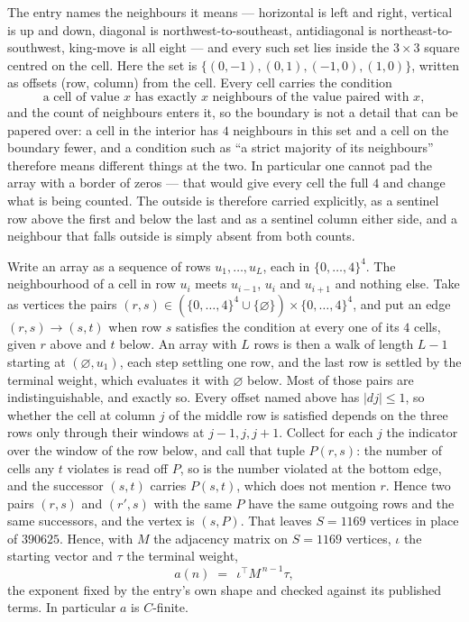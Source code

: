 \documentclass[11pt,a4paper]{article}
\theoremstyle{plain}
\theoremstyle{definition}
\begin{document}
The entry names the neighbours it means --- horizontal is left and right, vertical is up and
down, diagonal is northwest-to-southeast, antidiagonal is northeast-to-southwest, king-move is
all eight --- and every such set lies inside the $3\times3$ square centred on the cell. Here
the set is $\{(0,-1), (0,1), (-1,0), (1,0)\}$, written as offsets (row, column) from the cell. Every cell carries
the condition
\[
\text{a cell of value }x\text{ has exactly }x\text{ neighbours of the value paired with }x,
\]
and the count of neighbours enters it, so the boundary is not a detail that can be papered
over: a cell in the interior has $4$ neighbours in this set and a cell on the boundary
fewer, and a condition such as ``a strict majority of its neighbours'' therefore means
different things at the two. In particular one cannot pad the array with a border of zeros ---
that would give every cell the full $4$ and change what is being counted. The outside is
therefore carried
explicitly, as a sentinel row above the first and below the last and as a sentinel column
either side, and a neighbour that falls outside is simply absent from both counts.

Write an array as a sequence of rows $u_1,\dots,u_L$, each in
$\{0,\dots,4\}^{4}$. The neighbourhood of a cell in row $u_i$ meets $u_{i-1}$,
$u_i$ and $u_{i+1}$ and nothing else. Take as vertices the pairs
$(r,s)\in(\{0,\dots,4\}^{4}\cup\{\varnothing\})\times\{0,\dots,4\}^{4}$,
and put an edge $(r,s)\to(s,t)$ when row $s$ satisfies the condition at every one of its
$4$ cells, given $r$ above and $t$ below. An array with $L$ rows is then a walk of length
$L-1$ starting at $(\varnothing,u_1)$, each step settling one row, and the last row is
settled by the terminal weight, which evaluates it with $\varnothing$ below. Most of those pairs are indistinguishable, and exactly so. Every offset named above has $|dj|\le 1$, so whether the cell at column $j$ of the middle row is satisfied depends on the three rows only through their windows at $j-1,j,j+1$. Collect for each $j$ the indicator over the window of the row below, and call that tuple $P(r,s)$: the number of cells any $t$ violates is read off $P$, so is the number violated at the bottom edge, and the successor $(s,t)$ carries $P(s,t)$, which does not mention $r$. Hence two pairs $(r,s)$ and $(r',s)$ with the same $P$ have the same outgoing rows and the same successors, and the vertex is $(s,P)$. That leaves $S=1169$ vertices in place of $390625$. Hence,
with $M$ the adjacency matrix on $S=1169$ vertices, $\iota$ the starting vector and $\tau$ the
terminal weight,
\[
a(n)\;=\;\,\iota^{\!\top}M^{\,n-1}\tau ,
\]
the exponent fixed by the entry's own shape and checked against its published terms. In
particular $a$ is $C$-finite.
\end{document}
